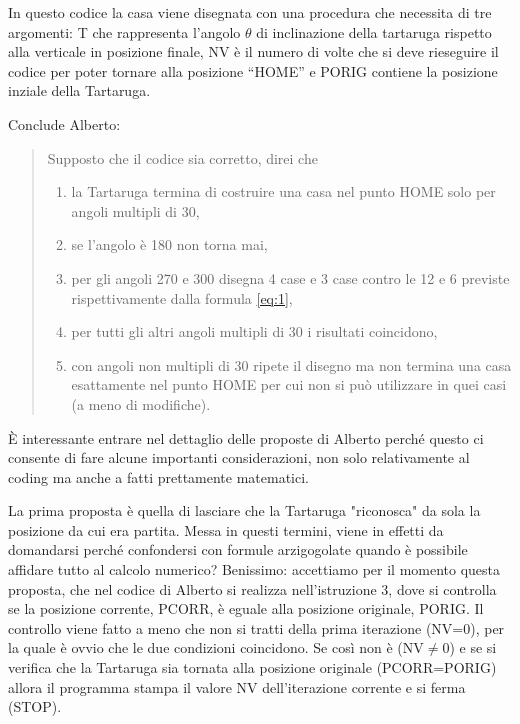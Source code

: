 \vskip 1cm

In questo codice la casa viene disegnata con una procedura che necessita di tre
argomenti: T che rappresenta l'angolo $\theta$ di inclinazione della tartaruga
rispetto alla verticale in posizione finale, NV è il numero di volte che si
deve rieseguire il codice per poter tornare alla posizione “HOME” e PORIG contiene
la posizione inziale della Tartaruga.

Conclude Alberto:  

\begin{quote}
Supposto che il codice sia corretto, direi che
\begin{enumerate}
	\item la Tartaruga termina di costruire una casa nel punto HOME solo
		per angoli multipli di 30,
	\item se l’angolo è 180 non torna mai,
	\item per gli angoli 270 e 300 disegna 4 case e 3 case
		contro le 12 e 6 previste rispettivamente dalla formula
		\ref{eq:1},
	\item per tutti gli altri angoli multipli di 30 i risultati coincidono,
	\item con angoli non multipli di 30 ripete il disegno ma non termina
		una casa esattamente nel punto HOME per cui non si può
		utilizzare in quei casi (a meno di modifiche). 
\end{enumerate}
\end{quote}  
  
È interessante entrare nel dettaglio delle proposte di Alberto perché questo ci
consente di fare alcune importanti considerazioni, non solo relativamente al
coding ma anche a fatti prettamente matematici. 

La prima proposta è quella di lasciare che la Tartaruga "riconosca" da sola la
posizione da cui era partita. Messa in questi termini, viene in effetti da
domandarsi perché confondersi con formule arzigogolate quando è possibile
affidare tutto al calcolo numerico? Benissimo: accettiamo per il momento questa
proposta, che nel codice di Alberto si realizza nell'istruzione 3, dove si
controlla se la posizione corrente, PCORR, è eguale alla posizione originale,
PORIG. Il controllo viene fatto a meno che non si tratti della prima iterazione
(NV=0), per la quale è ovvio che le due condizioni coincidono. Se così non è
(NV$\ne$0) e se si verifica che la Tartaruga sia tornata alla posizione
originale (PCORR=PORIG) allora il programma stampa il valore NV dell'iterazione
corrente e si ferma (STOP).


